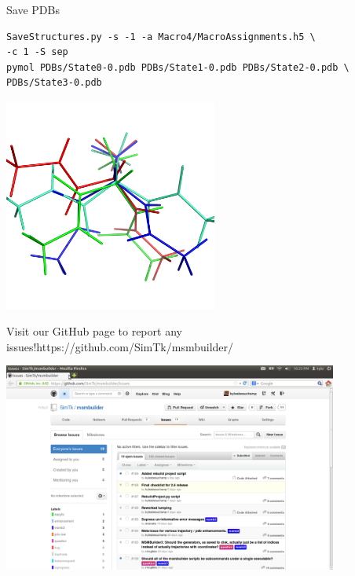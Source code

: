 \documentclass[10pt]{beamer}
\begin{document}
\begin{frame}[fragile]{Save PDBs}
 
\begin{verbatim}
SaveStructures.py -s -1 -a Macro4/MacroAssignments.h5 \
-c 1 -S sep
pymol PDBs/State0-0.pdb PDBs/State1-0.pdb PDBs/State2-0.pdb \
PDBs/State3-0.pdb
\end{verbatim}

\includegraphics[width=7.0cm]{Figures/ala.png}
 
\end{frame}

\begin{frame}{Visit our GitHub page to report any issues!}{https://github.com/SimTk/msmbuilder/}
 
 
 \includegraphics[width=11.0cm]{Figures/GitHub.png}
 
\end{frame}
\end{document}
